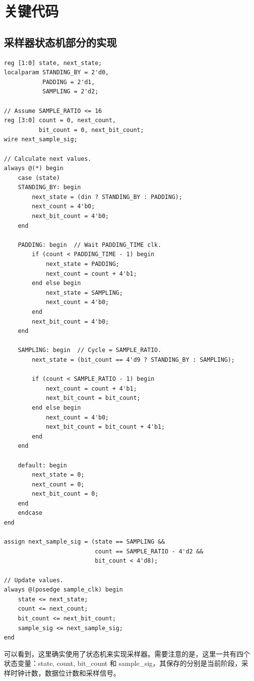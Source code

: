 \documentclass[11pt,a4paper]{article}
\begin{document}
\section{关键代码}

\subsection{采样器状态机部分的实现}

\begin{verbatim}
reg [1:0] state, next_state;
localparam STANDING_BY = 2'd0,
           PADDING = 2'd1,
           SAMPLING = 2'd2;

// Assume SAMPLE_RATIO <= 16
reg [3:0] count = 0, next_count,
          bit_count = 0, next_bit_count;
wire next_sample_sig;

// Calculate next values.
always @(*) begin
    case (state)
    STANDING_BY: begin
        next_state = (din ? STANDING_BY : PADDING);
        next_count = 4'b0;
        next_bit_count = 4'b0;
    end

    PADDING: begin  // Wait PADDING_TIME clk.
        if (count < PADDING_TIME - 1) begin
            next_state = PADDING;
            next_count = count + 4'b1;
        end else begin
            next_state = SAMPLING;
            next_count = 4'b0;
        end
        next_bit_count = 4'b0;
    end

    SAMPLING: begin  // Cycle = SAMPLE_RATIO.
        next_state = (bit_count == 4'd9 ? STANDING_BY : SAMPLING);

        if (count < SAMPLE_RATIO - 1) begin
            next_count = count + 4'b1;
            next_bit_count = bit_count;
        end else begin
            next_count = 4'b0;
            next_bit_count = bit_count + 4'b1;
        end
    end

    default: begin
        next_state = 0;
        next_count = 0;
        next_bit_count = 0;
    end
    endcase
end

assign next_sample_sig = (state == SAMPLING &&
                          count == SAMPLE_RATIO - 4'd2 &&
                          bit_count < 4'd8);

// Update values.
always @(posedge sample_clk) begin
    state <= next_state;
    count <= next_count;
    bit_count <= next_bit_count;
    sample_sig <= next_sample_sig;
end
\end{verbatim}

可以看到，这里确实使用了状态机来实现采样器。需要注意的是，这里一共有四个状态变量：state, count, bit\_count 和 sample\_sig，其保存的分别是当前阶段，采样时钟计数，数据位计数和采样信号。
\end{document}
